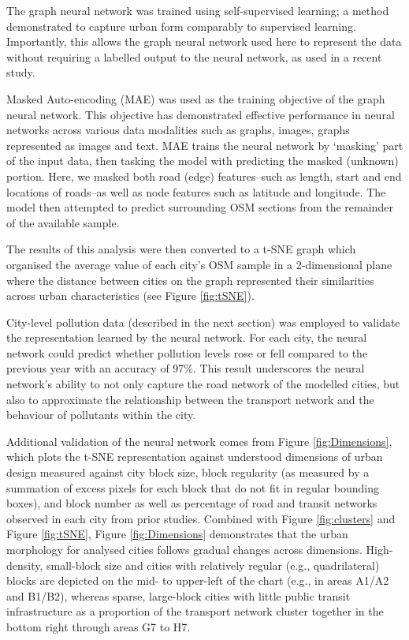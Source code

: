 \documentclass[preprint,12pt]{elsarticle}
\begin{document}
The graph neural network was trained using self-supervised learning; a method demonstrated to capture urban form comparably to supervised learning\cite{seneviratne2021self}. Importantly, this allows the graph neural network used here to represent the data without requiring a labelled output to the neural network, as used in a recent study\cite{Thompson2020}.

Masked Auto-encoding (MAE) was used as the training objective of the graph neural network. This objective has demonstrated effective performance in neural networks across various data modalities such as graphs\cite{hou2022graphmae}, images\cite{he2022masked}, graphs represented as images\cite{seneviratne2022self} and text\cite{devlin2018bert}. MAE trains the neural network by `masking' part of the input data, then tasking the model with predicting the masked (unknown) portion. Here, we masked both road (edge) features--such as length, start and end locations of roads--as well as node features such as latitude and longitude. The model then attempted to predict surrounding OSM sections from the remainder of the available sample. 

The results of this analysis were then converted to a t-SNE\cite{scikit-learn} graph which organised the average value of each city's OSM sample in a 2-dimensional plane where the distance between cities on the graph represented their similarities across urban characteristics (see Figure \ref{fig:tSNE}).

City-level pollution data (described in the next section) was employed to validate the representation learned by the neural network. For each city, the neural network could predict whether pollution levels rose or fell compared to the previous year with an accuracy of 97\%. This result underscores the neural network's ability to not only capture the road network of the modelled cities, but also to approximate the relationship between the transport network and the behaviour of pollutants within the city.

Additional validation of the neural network comes from Figure \ref{fig:Dimensions}, which plots the t-SNE representation against understood dimensions of urban design measured against city block size, block regularity (as measured by a summation of excess pixels for each block that do not fit in regular bounding boxes), and block number as well as percentage of road and transit networks observed in each city from prior studies\cite{Thompson2020,Nice2019b}. Combined with Figure \ref{fig:clusters} and Figure \ref{fig:tSNE}, Figure \ref{fig:Dimensions} demonstrates that the urban morphology for analysed cities follows gradual changes across dimensions. High-density, small-block size and cities with relatively regular (e.g., quadrilateral) blocks are depicted on the mid- to upper-left of the chart (e.g., in areas A1/A2 and B1/B2), whereas sparse, large-block cities with little public transit infrastructure as a proportion of the transport network cluster together in the bottom right through areas G7 to H7. 
\end{document}

